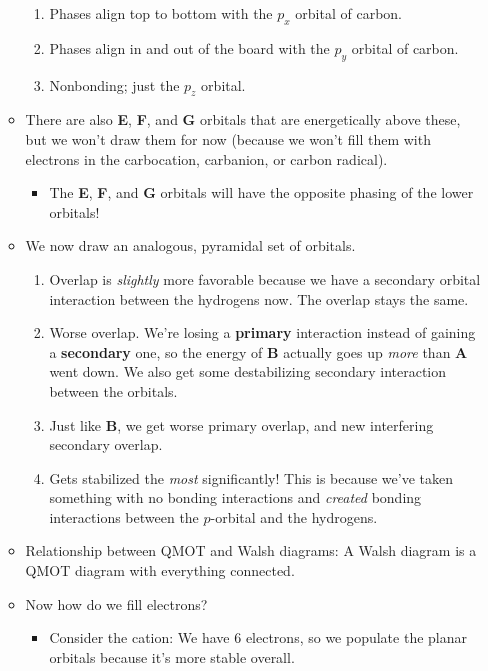 \documentclass[../notes.tex]{subfiles}
\begin{document}
\begin{itemize}
\begin{itemize}
\begin{enumerate}[label={\textbf{\Alph*}.}]
            \item Phases align top to bottom with the $p_x$ orbital of carbon.
            \item Phases align in and out of the board with the $p_y$ orbital of carbon.
            \item Nonbonding; just the $p_z$ orbital.
        \end{enumerate}
        \item There are also \textbf{E}, \textbf{F}, and \textbf{G} orbitals that are energetically above these, but we won't draw them for now (because we won't fill them with electrons in the carbocation, carbanion, or carbon radical).
        \begin{itemize}
            \item The \textbf{E}, \textbf{F}, and \textbf{G} orbitals will have the opposite phasing of the lower orbitals!
        \end{itemize}
        \item We now draw an analogous, pyramidal set of orbitals.
        \begin{enumerate}[label={\textbf{\Alph*}.}]
            \item Overlap is \emph{slightly} more favorable because we have a secondary orbital interaction between the hydrogens now. The  overlap stays the same.
            \item Worse overlap. We're losing a \textbf{primary} interaction instead of gaining a \textbf{secondary} one, so the energy of \textbf{B} actually goes up \emph{more} than \textbf{A} went down. We also get some destabilizing secondary interaction between the  orbitals.
            \item Just like \textbf{B}, we get worse primary overlap, and new interfering secondary overlap.
            \item Gets stabilized the \emph{most} significantly! This is because we've taken something with no bonding interactions and \emph{created} bonding interactions between the $p$-orbital and the hydrogens.
        \end{enumerate}
        \item Relationship between QMOT and Walsh diagrams: A Walsh diagram is a QMOT diagram with everything connected.
        \item Now how do we fill electrons?
        \begin{itemize}
            \item Consider the  cation: We have 6 electrons, so we populate the planar orbitals because it's more stable overall.

\end{itemize}
\end{itemize}
\end{itemize}
\end{document}
